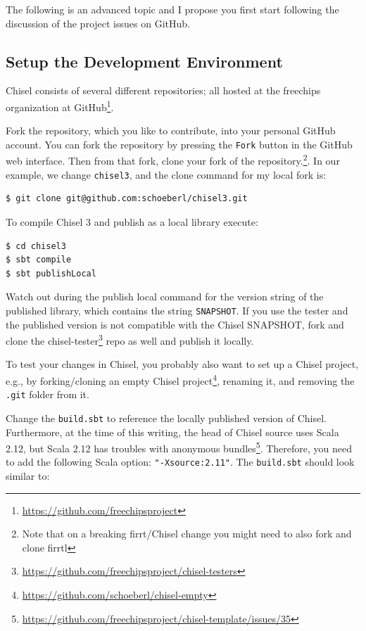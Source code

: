 \documentclass[%
    10pt,
    headinclude, footexclude,
    openright, %
    notitlepage,
    cleardoubleempty,
    headsepline,
    pointlessnumbers,
    bibtotoc, idxtotoc,
    ]{scrbook}
\newcommand{\code}[1]{{\small{\texttt{#1}}}}
\newcommand{\myref}[2]{\href{#1}{#2}}
\renewcommand{\myref}[2]{{#2}{\footnote{\url{#1}}}}
\begin{document}
The following is an advanced topic and I propose you first start following the discussion
of the project issues on GitHub.

\subsection{Setup the Development Environment}

Chisel consists of several different repositories; all hosted at
the \myref{https://github.com/freechipsproject}{freechips organization at GitHub}.

Fork the repository, which you like to contribute, into your personal GitHub account.
You can fork the repository by pressing the \code{Fork} button in the GitHub web interface.
Then from that fork, clone your fork of the repository.\footnote{Note that on a breaking
firrt/Chisel change you might need to also fork and clone firrtl}.
In our example, we change \code{chisel3}, and the clone command for my local fork is:

\begin{verbatim}
$ git clone git@github.com:schoeberl/chisel3.git
\end{verbatim}

To compile Chisel 3 and publish as a local library execute:
\begin{verbatim}
$ cd chisel3
$ sbt compile
$ sbt publishLocal
\end{verbatim}

Watch out during the publish local command for the version string of the published
library, which contains the string \code{SNAPSHOT}.
If you use the tester and the published version is not compatible with the Chisel
SNAPSHOT, fork and clone the \myref{https://github.com/freechipsproject/chisel-testers}{chisel-tester}
repo as well and publish it locally.

To test your changes in Chisel, you probably also want to set up a Chisel project,
e.g., by forking/cloning an \myref{https://github.com/schoeberl/chisel-empty}{empty Chisel project},
renaming it, and removing the \code{.git} folder from it.

Change the \code{build.sbt} to reference the locally published version of Chisel.
Furthermore, at the time of this writing, the head of Chisel source uses Scala 2.12, but Scala
2.12 has troubles with
\myref{https://github.com/freechipsproject/chisel-template/issues/35}{anonymous bundles}.
Therefore, you need to add the following Scala option: \code{"-Xsource:2.11"}.
The \code{build.sbt} should look similar to:
\end{document}
